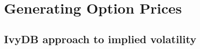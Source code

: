\documentclass[12pt]{article}
\begin{document}



\section{Generating Option Prices}

\subsection{IvyDB approach to implied volatility}
\end{document}
